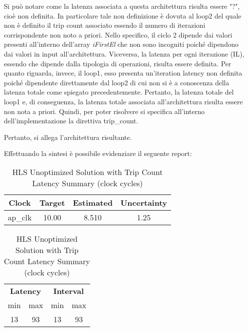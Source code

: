 Si può notare come la latenza associata a questa architettura risulta essere "?", cioè non definita. In particolare tale non definizione è dovuta al loop2 del quale non è definito il trip count associato essendo il numero di iterazioni corrispondente non noto a priori. Nello specifico, il ciclo 2 dipende dai valori presenti all'interno dell'array \textit{iFirstEl} che non sono incogniti poiché dipendono dai valori in input all'architettura. Viceversa, la latenza per ogni iterazione (IL), essendo che dipende dalla tipologia di operazioni, risulta essere definita. Per quanto riguarda, invece, il loop1, esso presenta un'iteration latency non definita poiché dipendente direttamente dal loop2 di cui non si è a conoscenza della latenza totale come spiegato precedentemente. Pertanto, la latenza totale del loop1 e, di conseguenza, la latenza totale associata all'architettura risulta essere non nota a priori. Quindi, per poter risolvere si specifica all'interno dell'implementazione la direttiva trip\_count. 



Pertanto, si allega l'architettura risultante.


Effettuando la sintesi è possibile evidenziare il seguente report:\\
\begin{table}[H]
	\centering
	\begin{minipage}[t]{0.45\linewidth}
		\centering
		\begin{tabular}{|c|c|c|c|}
			\hline
			\textbf{Clock} & \textbf{Target} & \textbf{Estimated} & \textbf{Uncertainty} \\
			\hline
			ap\_clk & 10.00 & 8.510 & 1.25 \\
			\hline
		\end{tabular}
		\caption{HLS Solution 1 with Trip Count Timing Summary (ns)}
		\label{tab:hls-solution-1-timing-summary}
	\end{minipage}
	\hfill
	\begin{minipage}[t]{0.45\linewidth}
		\centering
		\begin{tabular}{|c|c|c|c|}
			\hline
			\multicolumn{2}{|c|}{\textbf{Latency}} & \multicolumn{2}{|c|}{\textbf{Interval}} \\
			min & max & min & max \\
			\hline
			13 & 93 & 13 & 93 \\
			\hline
		\end{tabular}
		\caption{HLS Unoptimized Solution with Trip Count Latency Summary (clock cycles)}
		\label{tab:hls-unoptimized-solution-latency-summary}
	\end{minipage}
\end{table}

